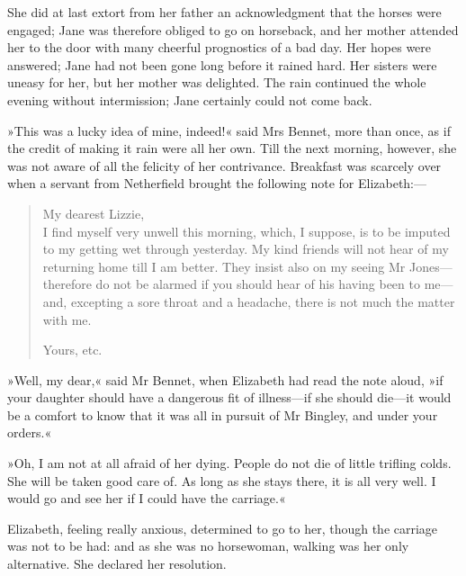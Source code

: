 She did at last extort from her father an acknowledgment that the horses were engaged; Jane was therefore obliged to go on horseback, and her mother attended her to the door with many cheerful prognostics of a bad day. Her hopes were answered; Jane had not been gone long before it rained hard. Her sisters were uneasy for her, but her mother was delighted. The rain continued the whole evening without intermission; Jane certainly could not come back.

»This was a lucky idea of mine, indeed!« said Mrs Bennet, more than once, as if the credit of making it rain were all her own. Till the next morning, however, she was not aware of all the felicity of her contrivance. Breakfast was scarcely over when a servant from Netherfield brought the following note for Elizabeth:—


\begin{samepage}
\begin{quotation}
\noindent My dearest Lizzie,\\

\indent I find myself very unwell this morning, which, I suppose, is to be imputed to my getting wet through yesterday. My kind friends will not hear of my returning home till I am better. They insist also on my seeing Mr Jones—therefore do not be alarmed if you should hear of his having been to me—and, excepting a sore throat and a headache, there is not much the matter with me.\\

\begin{flushright}
\noindent Yours, etc.
\end{flushright}
\end{quotation}
\end{samepage}



»Well, my dear,« said Mr Bennet, when Elizabeth had read the note aloud, »if your daughter should have a dangerous fit of illness—if she should die—it would be a comfort to know that it was all in pursuit of Mr Bingley, and under your orders.«

»Oh, I am not at all afraid of her dying. People do not die of little trifling colds. She will be taken good care of. As long as she stays there, it is all very well. I would go and see her if I could have the carriage.«

Elizabeth, feeling really anxious, determined to go to her, though the carriage was not to be had: and as she was no horsewoman, walking was her only alternative. She declared her resolution.

